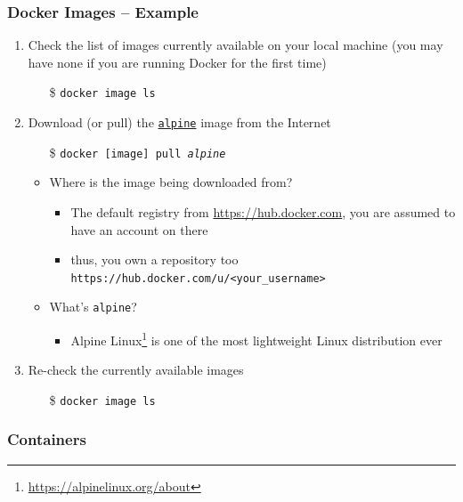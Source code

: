 \documentclass[presentation]{beamer}\mode<presentation>{\usetheme{AMSBolognaFC}}
\begin{document}
\begin{frame}
\frametitle{Docker Images -- Example}
	\begin{enumerate}
		\item Check the list of images currently available on your local machine (you may have none if you are running Docker for the first time)
		\begin{itemize}
		    \item[\$] \texttt{docker image \alert{ls}}
		\end{itemize}

		\item Download (or \alert{pull}) the \href{https://hub.docker.com/_/alpine/}{\texttt{alpine}} image from the Internet
		\begin{itemize}
		    \item[\$] \texttt{docker [image] \alert{pull} \textit{alpine}}
		    \item[] 
		    \item Where is the image being downloaded from?
		    \begin{itemize}
		        \item The default registry from \url{https://hub.docker.com}, you are assumed to have an account on there
		        \item thus, you own a repository too \texttt{https://hub.docker.com/u/\alert{<your\_username>}}
		    \end{itemize}
		    \item What's \texttt{alpine}?
		    \begin{itemize}
		        \item Alpine Linux\footnote{\url{https://alpinelinux.org/about}} is one of the most lightweight Linux distribution ever
		    \end{itemize}
		\end{itemize}

		\item Re-check the currently available images
		\begin{itemize}
		    \item[\$] \texttt{docker image \alert{ls}}
	    \end{itemize}
	\end{enumerate}
\end{frame}

\subsubsection{Containers}
\end{document}
